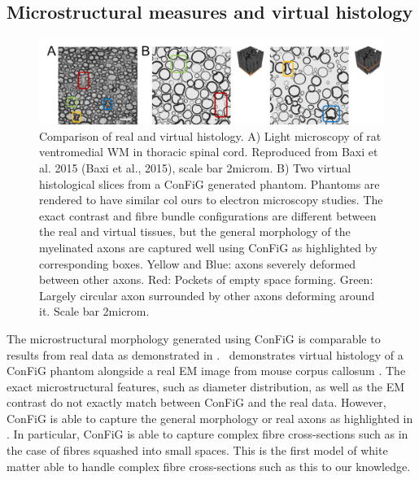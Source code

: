 \subsection{Microstructural measures and virtual histology}
\label{sec:config_result_micro_meas}

\begin{figure}
  \centering
  \includegraphics[width=\textwidth]{figures/config/virthist1_wbox_whitebg.png}
  \caption[Comparison of real and virtual histology]{Comparison of real  and virtual histology. A) Light microscopy of rat ventromedial WM in thoracic spinal cord. Reproduced from Baxi et al. 2015 (Baxi et al., 2015), scale bar 2microm. B) Two virtual histological slices from a ConFiG generated phantom. Phantoms are rendered to have similar col ours to electron microscopy studies. The exact contrast and fibre bundle configurations are different between the real and virtual tissues, but the general morphology of the myelinated axons are captured well using ConFiG as highlighted by corresponding boxes. Yellow and Blue: axons severely deformed between other axons. Red: Pockets of empty space forming. Green: Largely circular axon surrounded by other axons deforming around it. Scale bar 2microm.}
  \label{fig:config_res_real_vs_virt_hist}
\end{figure}

The microstructural morphology generated using ConFiG is comparable to results from real data as demonstrated in .~ demonstrates virtual histology of a ConFiG phantom alongside a real EM image from mouse corpus callosum \cite{Baxi2015}. The exact microstructural features, such as diameter distribution, as well as the EM contrast do not exactly match between ConFiG and the real data. However, ConFiG is able to capture the general morphology or real axons as highlighted in . In particular, ConFiG is able to capture complex fibre cross-sections such as in the case of fibres squashed into small spaces. This is the first model of white matter able to handle complex fibre cross-sections such as this to our knowledge.

